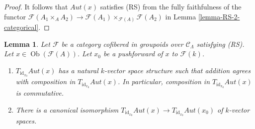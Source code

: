 \documentclass{stacks-project}
\theoremstyle{plain}
\newtheorem{lemma}[subsection]{Lemma}
\theoremstyle{definition}
\theoremstyle{remark}
\numberwithin{equation}{subsection}
\def\Ob{\mathop{\mathrm{Ob}}\nolimits}
\begin{document}
\begin{proof}
It follows that $\mathit{Aut}(x)$ satisfies (RS) from the fully
faithfulness of the functor
$\mathcal{F}(A_1 \times_A A_2) \to
\mathcal{F}(A_1) \times_{\mathcal{F}(A)} \mathcal{F}(A_2)$ in
Lemma \ref{lemma-RS-2-categorical}.
\end{proof}

\begin{lemma}
\label{lemma-Aut-functor-tangent-space}
Let $\mathcal{F}$ be a category cofibered in groupoids over
$\mathcal{C}_\Lambda$ satisfying (RS). Let
$x \in \Ob(\mathcal{F}(A))$. Let $x_0$ be a pushforward of $x$ to
$\mathcal{F}(k)$.
\begin{enumerate}
\item $T_{\text{id}_{x_0}} \mathit{Aut}(x)$ has a natural $k$-vector
space structure such that addition agrees with composition in
$T_{\text{id}_{x_0}} \mathit{Aut}(x)$. In particular, composition in
$T_{\text{id}_{x_0}} \mathit{Aut}(x)$ is commutative.
\item There is a canonical isomorphism
$T_{\text{id}_{x_0}} \mathit{Aut}(x) \to
T_{\text{id}_{x_0}} \mathit{Aut}(x_0)$
of $k$-vector spaces.
\end{enumerate}
\end{lemma}
\end{document}

